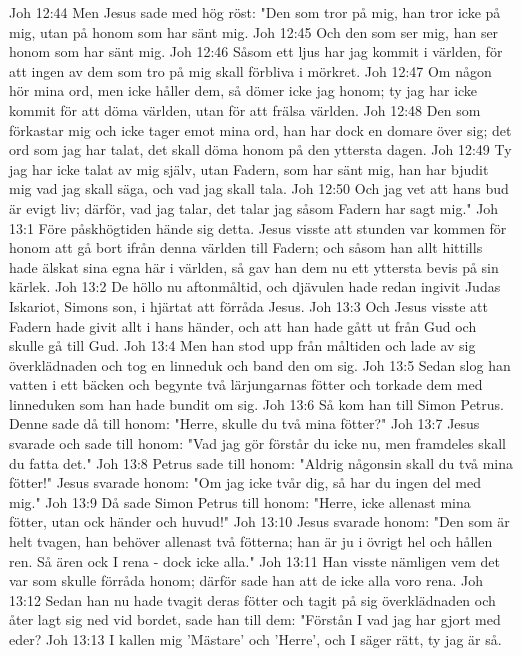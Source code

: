 Joh 12:44  Men Jesus sade med hög röst: "Den som tror på mig, han tror icke på mig, utan på honom som har sänt mig.
Joh 12:45  Och den som ser mig, han ser honom som har sänt mig.
Joh 12:46  Såsom ett ljus har jag kommit i världen, för att ingen av dem som tro på mig skall förbliva i mörkret.
Joh 12:47  Om någon hör mina ord, men icke håller dem, så dömer icke jag honom; ty jag har icke kommit för att döma världen, utan för att frälsa världen.
Joh 12:48  Den som förkastar mig och icke tager emot mina ord, han har dock en domare över sig; det ord som jag har talat, det skall döma honom på den yttersta dagen.
Joh 12:49  Ty jag har icke talat av mig själv, utan Fadern, som har sänt mig, han har bjudit mig vad jag skall säga, och vad jag skall tala.
Joh 12:50  Och jag vet att hans bud är evigt liv; därför, vad jag talar, det talar jag såsom Fadern har sagt mig."
Joh 13:1  Före påskhögtiden hände sig detta. Jesus visste att stunden var kommen för honom att gå bort ifrån denna världen till Fadern; och såsom han allt hittills hade älskat sina egna här i världen, så gav han dem nu ett yttersta bevis på sin kärlek.
Joh 13:2  De höllo nu aftonmåltid, och djävulen hade redan ingivit Judas Iskariot, Simons son, i hjärtat att förråda Jesus.
Joh 13:3  Och Jesus visste att Fadern hade givit allt i hans händer, och att han hade gått ut från Gud och skulle gå till Gud.
Joh 13:4  Men han stod upp från måltiden och lade av sig överklädnaden och tog en linneduk och band den om sig.
Joh 13:5  Sedan slog han vatten i ett bäcken och begynte två lärjungarnas fötter och torkade dem med linneduken som han hade bundit om sig.
Joh 13:6  Så kom han till Simon Petrus. Denne sade då till honom: "Herre, skulle du två mina fötter?"
Joh 13:7  Jesus svarade och sade till honom: "Vad jag gör förstår du icke nu, men framdeles skall du fatta det."
Joh 13:8  Petrus sade till honom: "Aldrig någonsin skall du två mina fötter!" Jesus svarade honom: "Om jag icke tvår dig, så har du ingen del med mig."
Joh 13:9  Då sade Simon Petrus till honom: "Herre, icke allenast mina fötter, utan ock händer och huvud!"
Joh 13:10  Jesus svarade honom: "Den som är helt tvagen, han behöver allenast två fötterna; han är ju i övrigt hel och hållen ren. Så ären ock I rena - dock icke alla."
Joh 13:11  Han visste nämligen vem det var som skulle förråda honom; därför sade han att de icke alla voro rena.
Joh 13:12  Sedan han nu hade tvagit deras fötter och tagit på sig överklädnaden och åter lagt sig ned vid bordet, sade han till dem: "Förstån I vad jag har gjort med eder?
Joh 13:13  I kallen mig 'Mästare' och 'Herre', och I säger rätt, ty jag är så.
